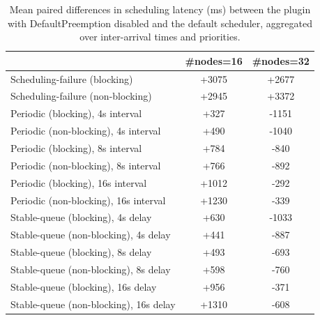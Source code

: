 \begin{table}[t]
\tiny
\setlength{\tabcolsep}{1.2pt}
\renewcommand{\arraystretch}{1.12}
\centering
\caption{Mean paired differences in scheduling latency (ms) between the plugin with DefaultPreemption disabled and the default scheduler, aggregated over inter-arrival times and priorities.}
\label{tab:latency-defpreempt0-std0-agg-arrival-prio}
\begin{tabular}{l c c}
\toprule
 & \#nodes=16 & \#nodes=32 \\
\midrule
Scheduling-failure (blocking) & +3075 & +2677 \\
Scheduling-failure (non-blocking) & +2945 & +3372 \\
Periodic (blocking), 4s interval & +327 & -1151 \\
Periodic (non-blocking), 4s interval & +490 & -1040 \\
Periodic (blocking), 8s interval & +784 & -840 \\
Periodic (non-blocking), 8s interval & +766 & -892 \\
Periodic (blocking), 16s interval & +1012 & -292 \\
Periodic (non-blocking), 16s interval & +1230 & -339 \\
Stable-queue (blocking), 4s delay & +630 & -1033 \\
Stable-queue (non-blocking), 4s delay & +441 & -887 \\
Stable-queue (blocking), 8s delay & +493 & -693 \\
Stable-queue (non-blocking), 8s delay & +598 & -760 \\
Stable-queue (blocking), 16s delay & +956 & -371 \\
Stable-queue (non-blocking), 16s delay & +1310 & -608 \\
\bottomrule
\end{tabular}
\end{table}
